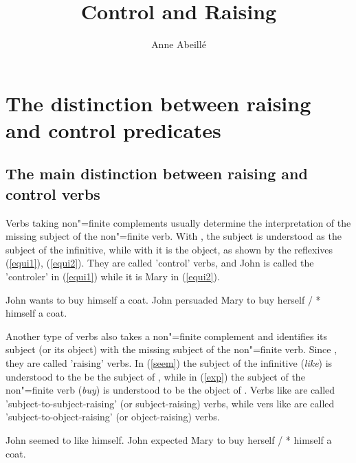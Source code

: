 \documentclass[output=paper
	        ,collection
	        ,collectionchapter
 	        ,biblatex
                ,babelshorthands
                ,newtxmath
                ,draftmode
                ,colorlinks, citecolor=brown
]{langscibook}
\author{%
	Anne Abeillé\affiliation{Université de Paris}%
}
\title{Control and Raising}
\begin{document}
\maketitle
\label{chap-control-raising}



\section{The distinction between raising and control predicates}

\subsection{The main distinction between raising and control verbs}

Verbs taking non"=finite complements usually determine the interpretation of the missing subject of the non"=finite verb. With , the subject is understood as the subject of the infinitive, while with  it is the object, as shown by the reflexives (\ref{equi1}), (\ref{equi2}). They are called 'control' verbs, and John is called the 'controler' in (\ref{equi1}) while it is Mary in (\ref{equi2}).

	\begin{exe}
	\ex \begin{xlist}
	\ex John wants to buy himself a coat. \label{equi1}
   \ex 	John persuaded Mary to buy herself / * himself a coat.\label{equi2}
 \end{xlist}
 \end{exe}


Another type of verbs also takes a non"=finite complement and identifies its subject (or its object) with the missing subject of the non"=finite verb. Since \citet{Postal1974}, they are called 'raising' verbs. In (\ref{seem}) the subject of the infinitive (\emph{like}) is understood to the be the subject of , while in (\ref{exp}) the subject of the non"=finite verb (\emph{buy}) is understood to be the object of . Verbs like  are called 'subject-to-subject-raising' (or subject-raising) verbs, while
vers like  are called 'subject-to-object-raising' (or object-raising) verbs.

\begin{exe}
	\ex \begin{xlist}
	\ex John seemed to like himself.\label{seem}
\ex  John expected Mary to buy herself / * himself a coat. \label{exp}
\end{xlist}
 \end{exe}
 
\end{document}
